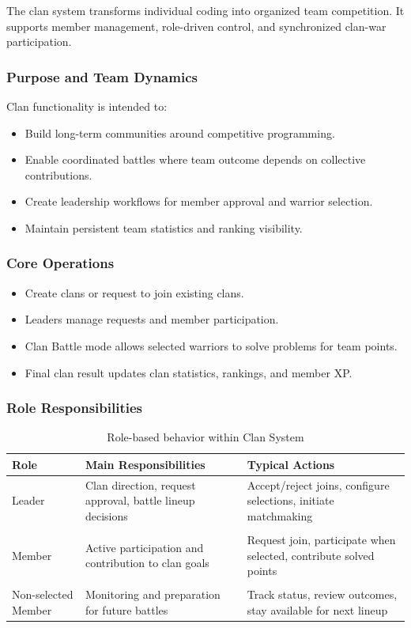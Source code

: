 \documentclass[12pt]{article}
\begin{document}
The clan system transforms individual coding into organized team competition. It supports member management, role-driven control, and synchronized clan-war participation.

\subsubsection{Purpose and Team Dynamics}

Clan functionality is intended to:
\begin{itemize}
\item Build long-term communities around competitive programming.
\item Enable coordinated battles where team outcome depends on collective contributions.
\item Create leadership workflows for member approval and warrior selection.
\item Maintain persistent team statistics and ranking visibility.
\end{itemize}

\subsubsection{Core Operations}

\begin{itemize}
\item Create clans or request to join existing clans.
\item Leaders manage requests and member participation.
\item Clan Battle mode allows selected warriors to solve problems for team points.
\item Final clan result updates clan statistics, rankings, and member XP.
\end{itemize}
\clearpage
\subsubsection{Role Responsibilities}

\begin{table}[h]
\centering
\begin{tabularx}{\textwidth}{>{\raggedright\arraybackslash}p{3cm} >{\raggedright\arraybackslash}X >{\raggedright\arraybackslash}X}
\toprule
\textbf{Role} & \textbf{Main Responsibilities} & \textbf{Typical Actions} \\
\midrule
Leader & Clan direction, request approval, battle lineup decisions & Accept/reject joins, configure selections, initiate matchmaking \\ \\
Member & Active participation and contribution to clan goals & Request join, participate when selected, contribute solved points \\ \\
Non-selected Member & Monitoring and preparation for future battles & Track status, review outcomes, stay available for next lineup \\
\bottomrule
\end{tabularx}
\caption{Role-based behavior within Clan System}
\end{table}
\end{document}
